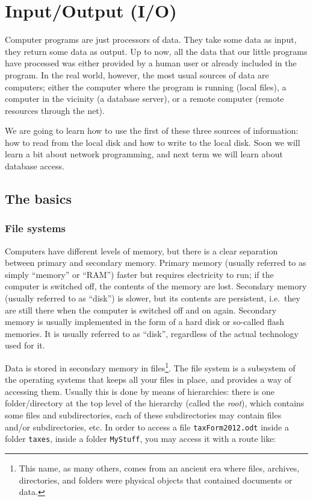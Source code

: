 
\section{Input/Output (I/O)}
\label{sec:inputoutput-io}

Computer programs are just processors of data. They take some data as
input, they return some data as output. Up to now, all the data that
our little programs have processed was either provided by a human user
or already included in the program. In the real world, however, the
most usual sources of data are computers; either the computer where
the program is running (local files), a computer in the vicinity (a
database server), or a remote computer (remote resources through the
net). 

We are going to learn how to use the first of these three sources
of information: how to read from the local disk and how to write to
the local disk. 
%
Soon we will learn a bit about network programming, and next term
we will learn about database access. 

\subsection{The basics}
\label{sec:basics}

\subsubsection{File systems}
\label{sec:filesystems}

Computers have different levels of memory, but there is a clear
separation between primary and secondary memory. Primary memory
(usually referred to as simply ``memory'' or ``RAM'')
faster but requires electricity to run; if the computer is switched
off, the contents of the memory are lost. Secondary memory (usually
referred to as ``disk'') is slower,
but its contents are persistent, i.e.~they are still there when the
computer is switched off and on again. Secondary memory is usually
implemented in the form of a hard disk or so-called flash
memories. It is usually referred to as ``disk'', regardless of the
actual technology used for it. 

Data is stored in secondary memory in files\footnote{This name, as
  many others, comes from an ancient era where files, archives,
  directories, and folders were physical objects that contained
  documents or data.}.  
The file system is a subsystem of the operating
systems that keeps all your files in place, and provides a way of
accessing them. Usually this is done by means of hierarchies: there is
one folder/directory at the top level of the hierarchy (called the
\emph{root}), which contains some files and subdirectories, each of
these subdirectories may contain files and/or subdirectories, etc. In
order to access a file \verb+taxForm2012.odt+ inside a folder
\verb+taxes+, inside a folder \verb+MyStuff+, you may access it with a
route like: 

